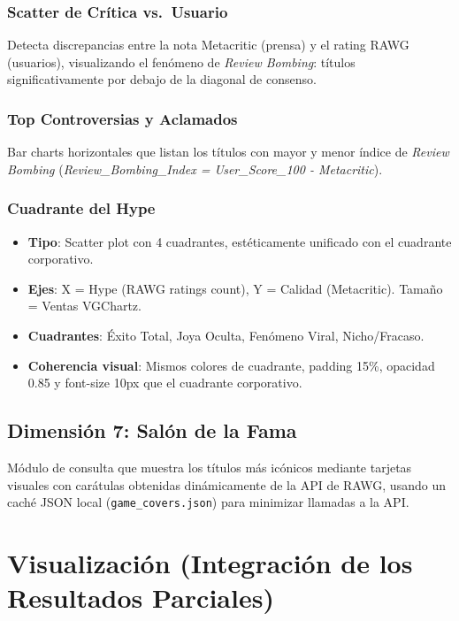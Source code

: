 \documentclass[11pt,a4paper]{article}
\begin{document}
\subsubsection{Scatter de Crítica vs.\ Usuario}
Detecta discrepancias entre la nota Metacritic (prensa) y el rating RAWG (usuarios), visualizando el fenómeno de \textit{Review Bombing}: títulos significativamente por debajo de la diagonal de consenso.

\subsubsection{Top Controversias y Aclamados}
Bar charts horizontales que listan los títulos con mayor y menor índice de \textit{Review Bombing} (\textit{Review\_Bombing\_Index = User\_Score\_100 - Metacritic}).

\subsubsection{Cuadrante del Hype}
\begin{itemize}
  \item \textbf{Tipo}: Scatter plot con 4 cuadrantes, estéticamente unificado con el cuadrante corporativo.
  \item \textbf{Ejes}: X = Hype (RAWG ratings count), Y = Calidad (Metacritic). Tamaño = Ventas VGChartz.
  \item \textbf{Cuadrantes}: Éxito Total, Joya Oculta, Fenómeno Viral, Nicho/Fracaso.
  \item \textbf{Coherencia visual}: Mismos colores de cuadrante, padding 15\%, opacidad 0.85 y font-size 10px que el cuadrante corporativo.
\end{itemize}

\subsection{Dimensión 7: Salón de la Fama}

Módulo de consulta que muestra los títulos más icónicos mediante tarjetas visuales con carátulas obtenidas dinámicamente de la API de RAWG, usando un caché JSON local (\texttt{game\_covers.json}) para minimizar llamadas a la API.


\newpage
\section{Visualización (Integración de los Resultados Parciales)}
\end{document}
